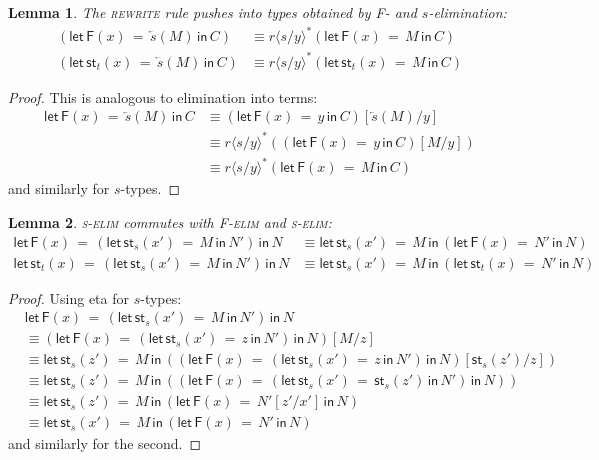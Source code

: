 \documentclass[10pt]{article}
\newtheorem{lemma}{Lemma}
\theoremstyle{definition}
\newcommand{\rewrite}[2]{\overleftarrow{#1}(#2)}
\newcommand\St[2]{\ensuremath{{#1}^*(#2)}}
\newcommand\StI[2]{\ensuremath{\mathsf{st}_{#1}(#2)}}
\newcommand\StE[4]{\ensuremath{\mathsf{let} \, \StI{#1}{#3} \, = \, {#2} \, \mathsf{in} \, #4}}
\newcommand\FE[3]{\ensuremath{\mathsf{let} \, \mathsf{F}(#2) \, = \, {#1} \, \mathsf{in} \, #3}}
\newcommand\ap[2]{\ensuremath{#1 \langle #2 \rangle }}
\begin{document}
\begin{lemma}
The \textsc{rewrite} rule pushes into types obtained by \textsf{F}- and $s$-elimination:
\begin{align*}
(\FE{\rewrite{s}{M}}{x}{C}) &\equiv \St{\ap{r}{s/y}}{\FE{M}{x}{C}} \\
(\StE{t}{\rewrite{s}{M}}{x}{C}) &\equiv \St{\ap{r}{s/y}}{\StE{t}{M}{x}{C}}
\end{align*}
\end{lemma}
\begin{proof}
This is analogous to elimination into terms:
\begin{align*}
\FE{\rewrite{s}{M}}{x}{C}
&\equiv (\FE{y}{x}{C})[\rewrite{s}{M}/y] \\
&\equiv \St{\ap{r}{s/y}}{(\FE{y}{x}{C})[M/y]} \\
&\equiv \St{\ap{r}{s/y}}{\FE{M}{x}{C}}
\end{align*}
and similarly for $s$-types.
\end{proof}

\begin{lemma}
\textsc{s-elim} commutes with \textsc{F-elim} and \textsc{s-elim}:
\begin{align*}
\FE{(\StE{s}{M}{x'}{N'})}{x}{N} &\equiv \StE{s}{M}{x'}{(\FE{N'}{x}{N})} \\
\StE{t}{(\StE{s}{M}{x'}{N'})}{x}{N} &\equiv \StE{s}{M}{x'}{(\StE{t}{N'}{x}{N})}
\end{align*}
\end{lemma}
\begin{proof}
Using eta for $s$-types:
\begin{align*}
&\FE{(\StE{s}{M}{x'}{N'})}{x}{N} \\
&\equiv (\FE{(\StE{s}{z}{x'}{N'})}{x}{N})[M/z] \\
&\equiv \StE{s}{M}{z'}{((\FE{(\StE{s}{z}{x'}{N'})}{x}{N})[\StI{s}{z'}/z])} \\
&\equiv \StE{s}{M}{z'}{((\FE{(\StE{s}{\StI{s}{z'}}{x'}{N'})}{x}{N}))} \\
&\equiv \StE{s}{M}{z'}{(\FE{N'[z'/x']}{x}{N})} \\
&\equiv \StE{s}{M}{x'}{(\FE{N'}{x}{N})}
\end{align*}
and similarly for the second.
\end{proof}
\end{document}
